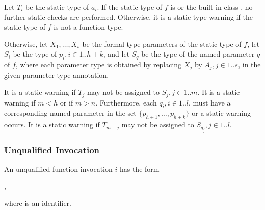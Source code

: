 \documentclass{article}
\begin{document}
\LMHash{}
Let $T_i$ be the static type of $a_i$.
If the static type of $f$ is \DYNAMIC{} or the built-in class \FUNCTION{},
no further static checks are performed.
Otherwise, it is a static type warning if the static type of $f$ is not a function type.

\LMHash{}
Otherwise, let $X_1, \ldots, X_s$ be the formal type parameters of the static type of $f$,
let $S_i$ be the type of $p_i, i \in 1 .. h+k$,
and let $S_q$ be the type of the named parameter $q$ of $f$,
where each parameter type is obtained by replacing $X_j$ by $A_j, j \in 1 .. s$, in the given parameter type annotation.


\LMHash{}
It is a static warning if $T_j$ may not be assigned to $S_j, j \in 1 .. m$.
It is a static warning if $m < h$ or if $m > n$.
Furthermore, each $q_i, i \in 1 .. l$, must have a corresponding named parameter in the set $\{p_{h+1}, \ldots, p_{h+k}\}$ or a static warning occurs.
It is a static warning if $T_{m+j}$ may not be assigned to $S_{q_j}, j \in 1 .. l$.


\subsubsection{Unqualified Invocation}

\LMHash{}
An unqualified function invocation $i$ has the form

,

\noindent
where \id{} is an identifier.

\end{document}
